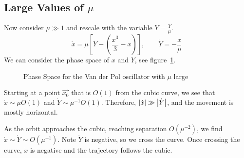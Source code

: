 \documentclass[../Main.tex]{subfiles}
\begin{document}
\subsection{Large Values of \texorpdfstring{$\mu$}{the Parameter}}
Now consider $\mu \gg 1$ and rescale with the variable $Y = \frac Y \mu$.
\begin{equation*}
    \dot{x} = \mu\left[Y - \left(\frac{x^3}{3} - x\right)\right],\qquad \dot{Y} = -\frac x \mu
\end{equation*}
We can consider the phase space of $x$ and $Y$, see figure~\ref{figVanDerPolPS}.
\begin{figure}
    \centering
    \caption{Phase Space for the Van der Pol oscillator with $\mu$ large}
    \label{figVanDerPolPS}
\end{figure}

Starting at a point $\vec{x_0}$ that is $O(1)$ from the cubic curve, we see that $\dot{x} \sim \mu O(1)$ and $\dot{Y} \sim \mu^{-1}O(1)$. Therefore, $\left|\dot{x}\right| \gg \left|\dot{Y}\right|$, and the movement is mostly horizontal.

As the orbit approaches the cubic, reaching separation $O(\mu^{-2})$, we find $\dot{x} \sim \dot{Y} \sim O(\mu^{-1})$. Note $\dot{Y}$ is negative, so we cross the curve. Once crossing the curve, $\dot{x}$ is negative and the trajectory follows the cubic.
\end{document}
